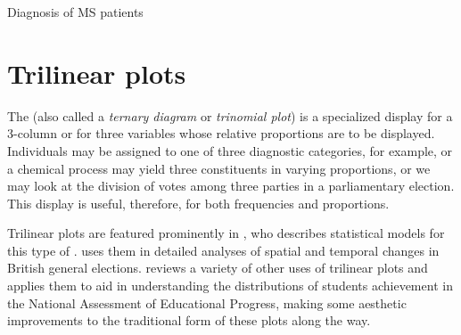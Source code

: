 \documentclass[10pt,krantz2]{krantz}\usepackage[]{graphicx}\usepackage[]{color}
\begin{document}
\begin{Example}[MS2]{Diagnosis of MS patients}
\end{Example}

\section{Trilinear plots}\label{sec:twoway-trilinear}

The 
(also called a \emph{ternary diagram} or \emph{trinomial plot})
is a specialized display for a 3-column \ctab or for
three variables whose relative proportions are to be displayed.
Individuals may be assigned to one of three diagnostic categories,
for example, or a chemical process may yield three constituents
in varying proportions, or we may look at the division of votes
among three parties in a parliamentary election.
This display is useful, therefore, for both frequencies
and proportions.

Trilinear plots are featured prominently in \citet{Aitchison:86},
who describes statistical models for this type of
.  \citet{Upton:76,Upton:94}
uses them in detailed analyses of spatial and temporal changes in
British general elections.
\citet{Wainer:96} reviews a variety of other uses of trilinear
plots and applies them to aid in understanding the distributions
of students achievement in the
National Assessment of Educational Progress,
making some aesthetic improvements to the traditional form of these
plots along the way.
\end{document}
